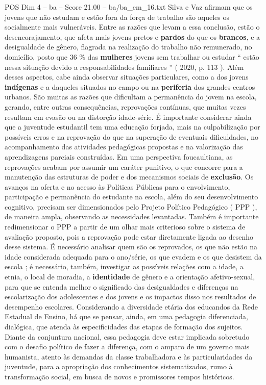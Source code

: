 \begin{textsample}{POS Dim 4 – ba – Score 21.00 – ba/ba\_em\_16.txt}
Silva e Vaz afirmam que os jovens que não estudam e estão fora da força de trabalho são aqueles os socialmente mais vulneráveis.
Entre as razões que levam a essa conclusão, estão o desencorajamento, que afeta mais jovens pretos e \textbf{pardos} do que os \textbf{brancos}, e a desigualdade de gênero, flagrada na realização do trabalho não remunerado, no domicílio, posto que 36 \% das \textbf{mulheres} jovens sem trabalhar ou estudar “ estão nessa situação devido a responsabilidades familiares ” ( 2020, p. 113 ).
Além desses aspectos, cabe ainda observar situações particulares, como a dos jovens \textbf{indígenas} e a daqueles situados no campo ou na \textbf{periferia} dos grandes centros urbanos.
São muitas as razões que dificultam a permanência do jovem na escola, gerando, entre outras consequências, reprovações contínuas, que muitas vezes resultam em evasão ou na distorção idade-série.
É importante considerar ainda que a juventude estudantil tem uma educação forjada, mais na culpabilização por possíveis erros e na reprovação do que na superação de eventuais dificuldades, no acompanhamento das atividades pedagógicas propostas e na valorização das aprendizagens parciais construídas.
Em uma perspectiva foucaultiana, as reprovações acabam por assumir um caráter punitivo, o que concorre para a manutenção das estruturas de poder e dos mecanismos sociais de \textbf{exclusão}.
Os avanços na oferta e no acesso às Políticas Públicas para o envolvimento, participação e permanência do estudante na escola, além do seu desenvolvimento cognitivo, precisam ser dimensionados pelo Projeto Político Pedagógico ( PPP ), de maneira ampla, observando as necessidades levantadas.
Também é importante redimensionar o PPP a partir de um olhar mais criterioso sobre o sistema de avaliação proposto, pois a reprovação pode estar diretamente ligada ao desenho desse sistema.
É necessário analisar quem são os reprovados, os que não estão na idade considerada adequada para o ano/série, os que evadem e os que desistem da escola ; é necessário, também, investigar as possíveis relações com a idade, a etnia, o local de moradia, a \textbf{identidade} de gênero e a orientação afetivo-sexual, para que se entenda melhor o significado das desigualdades e diferenças na escolarização dos adolescentes e dos jovens e os impactos disso nos resultados de desempenho escolares.
Considerando a diversidade etária dos educandos da Rede Estadual de Ensino, há que se pensar, ainda, em uma pedagogia diferenciada, dialógica, que atenda às especificidades das etapas de formação dos sujeitos.
Diante da conjuntura nacional, essa pedagogia deve estar implicada sobretudo com o desafio político de fazer a diferença, com o amparo de um governo mais humanista, atento às demandas da classe trabalhadora e às particularidades da juventude, para a apropriação dos conhecimentos sistematizados, rumo à transformação social, em busca de novos e promissores tempos históricos.

\end{textsample}
